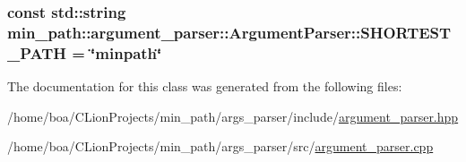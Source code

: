 \subsubsection[{\texorpdfstring{S\+H\+O\+R\+T\+E\+S\+T\+\_\+\+P\+A\+TH}{SHORTEST_PATH}}]{\setlength{\rightskip}{0pt plus 5cm}const std\+::string min\+\_\+path\+::argument\+\_\+parser\+::\+Argument\+Parser\+::\+S\+H\+O\+R\+T\+E\+S\+T\+\_\+\+P\+A\+TH = \char`\"{}minpath\char`\"{}}\hypertarget{a00002_a552c30c543bb251f8c43b528ce8d3537_a552c30c543bb251f8c43b528ce8d3537}{}\label{a00002_a552c30c543bb251f8c43b528ce8d3537_a552c30c543bb251f8c43b528ce8d3537}


The documentation for this class was generated from the following files\+:\begin{DoxyCompactItemize}
\item 
/home/boa/\+C\+Lion\+Projects/min\+\_\+path/args\+\_\+parser/include/\hyperlink{a00011}{argument\+\_\+parser.\+hpp}\item 
/home/boa/\+C\+Lion\+Projects/min\+\_\+path/args\+\_\+parser/src/\hyperlink{a00013}{argument\+\_\+parser.\+cpp}\end{DoxyCompactItemize}
